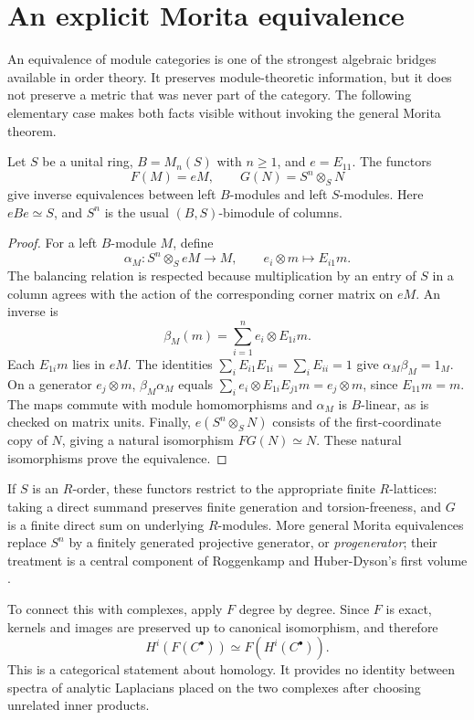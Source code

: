 \section{An explicit Morita equivalence}

An equivalence of module categories is one of the strongest algebraic
bridges available in order theory. It preserves module-theoretic
information, but it does not preserve a metric that was never part
of the category. The following elementary case makes both facts
visible without invoking the general Morita theorem.

\begin{theorem}
\label{thm:matrix-morita}
Let $S$ be a unital ring, $B=M_n(S)$ with $n\ge1$, and
$e=E_{11}$. The functors
\[
 F(M)=eM,\qquad G(N)=S^n\otimes_S N
\]
give inverse equivalences between left $B$-modules and left
$S$-modules. Here $eBe\simeq S$, and $S^n$ is the usual
$(B,S)$-bimodule of columns.
\end{theorem}

\begin{proof}
For a left $B$-module $M$, define
\[
 \alpha_M:S^n\otimes_S eM\longrightarrow M,
 \qquad e_i\otimes m\longmapsto E_{i1}m.
\]
The balancing relation is respected because multiplication by an
entry of $S$ in a column agrees with the action of the corresponding
corner matrix on $eM$. An inverse is
\[
 \beta_M(m)=\sum_{i=1}^n e_i\otimes E_{1i}m.
\]
Each $E_{1i}m$ lies in $eM$. The identities
$\sum_iE_{i1}E_{1i}=\sum_iE_{ii}=1$ give
$\alpha_M\beta_M=1_M$. On a generator $e_j\otimes m$,
$\beta_M\alpha_M$ equals
$\sum_i e_i\otimes E_{1i}E_{j1}m=e_j\otimes m$,
since $E_{11}m=m$. The maps commute with module homomorphisms and
$\alpha_M$ is $B$-linear, as is checked on matrix units. Finally,
$e(S^n\otimes_SN)$ consists of the first-coordinate copy of $N$,
giving a natural isomorphism $FG(N)\simeq N$. These natural
isomorphisms prove the equivalence.
\end{proof}

If $S$ is an $R$-order, these functors restrict to the appropriate
finite $R$-lattices: taking a direct summand preserves finite
generation and torsion-freeness, and $G$ is a finite direct sum on
underlying $R$-modules. More general Morita equivalences replace
$S^n$ by a finitely generated projective generator, or
\emph{progenerator}; their treatment is a central component of
Roggenkamp and Huber-Dyson's first volume
\cite[Ch.~III, \S\S1--2]{RoggenkampHuberDyson1970}.

To connect this with complexes, apply $F$ degree by degree. Since
$F$ is exact, kernels and images are preserved up to canonical
isomorphism, and therefore
\[
 H^i(F(C^\bullet))\simeq F(H^i(C^\bullet)).
\]
This is a categorical statement about homology. It provides no
identity between spectra of analytic Laplacians placed on the two
complexes after choosing unrelated inner products.

